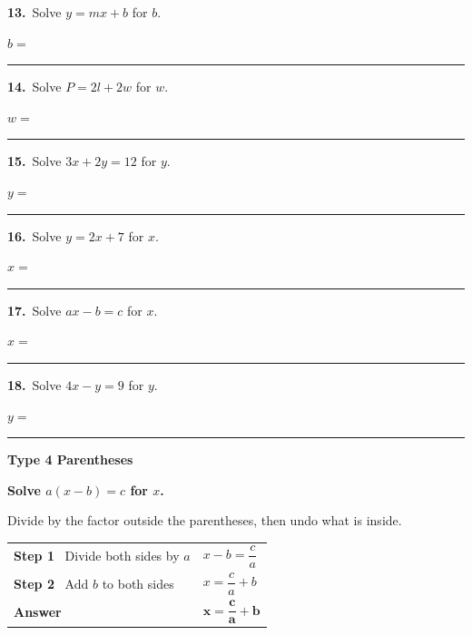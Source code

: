 \documentclass[11pt,letterpaper]{article}
\newcommand{\topicbar}[1]{\needspace{4.5cm}\par\vspace{5mm}
  \begin{tcolorbox}[enhanced,colback=fmtitle,colframe=fmtitle,arc=2mm,left=4mm,top=1.5mm,bottom=1.5mm]
  \color{white}\bfseries\large #1
  \end{tcolorbox}}
\begin{document}
\needspace{3.5cm}\par\vspace{3mm}\noindent \begin{minipage}[t][3.0cm]{0.48\linewidth}\raggedright{\color{fmturn}\bfseries 13.}\ Solve $y = mx + b$ for $b$.\par\vfill\hfill $b = $\ \rule{3.2cm}{0.4pt}\end{minipage}\hfill \begin{minipage}[t][3.0cm]{0.48\linewidth}\raggedright{\color{fmturn}\bfseries 14.}\ Solve $P = 2l + 2w$ for $w$.\par\vfill\hfill $w = $\ \rule{3.2cm}{0.4pt}\end{minipage}\par
\needspace{3.5cm}\par\vspace{3mm}\noindent \begin{minipage}[t][3.0cm]{0.48\linewidth}\raggedright{\color{fmturn}\bfseries 15.}\ Solve $3x + 2y = 12$ for $y$.\par\vfill\hfill $y = $\ \rule{3.2cm}{0.4pt}\end{minipage}\hfill \begin{minipage}[t][3.0cm]{0.48\linewidth}\raggedright{\color{fmturn}\bfseries 16.}\ Solve $y = 2x + 7$ for $x$.\par\vfill\hfill $x = $\ \rule{3.2cm}{0.4pt}\end{minipage}\par
\needspace{3.5cm}\par\vspace{3mm}\noindent \begin{minipage}[t][3.0cm]{0.48\linewidth}\raggedright{\color{fmturn}\bfseries 17.}\ Solve $ax - b = c$ for $x$.\par\vfill\hfill $x = $\ \rule{3.2cm}{0.4pt}\end{minipage}\hfill \begin{minipage}[t][3.0cm]{0.48\linewidth}\raggedright{\color{fmturn}\bfseries 18.}\ Solve $4x - y = 9$ for $y$.\par\vfill\hfill $y = $\ \rule{3.2cm}{0.4pt}\end{minipage}\par
\needspace{9cm}\topicbar{Type 4 \quad Parentheses}
\begin{watchme}\textbf{Solve $a(x - b) = c$ for $x$.}\par\vspace{1mm}
Divide by the factor outside the parentheses, then undo what is inside.\par\vspace{1mm}
\renewcommand{\arraystretch}{2.1}\begin{tabular}{@{}l l@{}}
\textbf{Step 1} \ Divide both sides by $a$ & $x - b = \dfrac{c}{a}$\\
\textbf{Step 2} \ Add $b$ to both sides & $x = \dfrac{c}{a} + b$\\
\textbf{Answer} & $\boldsymbol{x = \dfrac{c}{a} + b}$
\end{tabular}\end{watchme}
\end{document}
